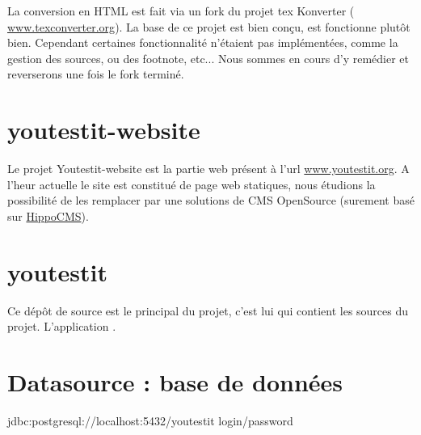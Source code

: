 La conversion en HTML est fait via un fork du projet tex Konverter (
		\href{http://www.texconverter.org}{www.texconverter.org}). La base de ce projet est bien
conçu, est fonctionne plutôt bien. Cependant certaines fonctionnalité n'étaient pas implémentées,
comme la gestion des sources, ou des footnote, etc... Nous sommes en cours d'y remédier et
reverserons une fois le fork terminé. 

\section{youtestit-website}	
Le projet Youtestit-website est la partie web présent à l'url \href{http://www.youtestit.org}{www.youtestit.org}.
A l'heur actuelle le site est constitué de page web statiques, nous étudions la possibilité de les
remplacer par une solutions de CMS OpenSource (surement basé sur \href{http://www.onehippo.com/en/products/cms}{HippoCMS}). 



\section{youtestit}
Ce dépôt de source est le principal du projet, c'est lui qui contient les sources du projet.
L'application \youTestIt{}. 



\section{Datasource : base de données}







jdbc:postgresql://localhost:5432/youtestit
login/password
